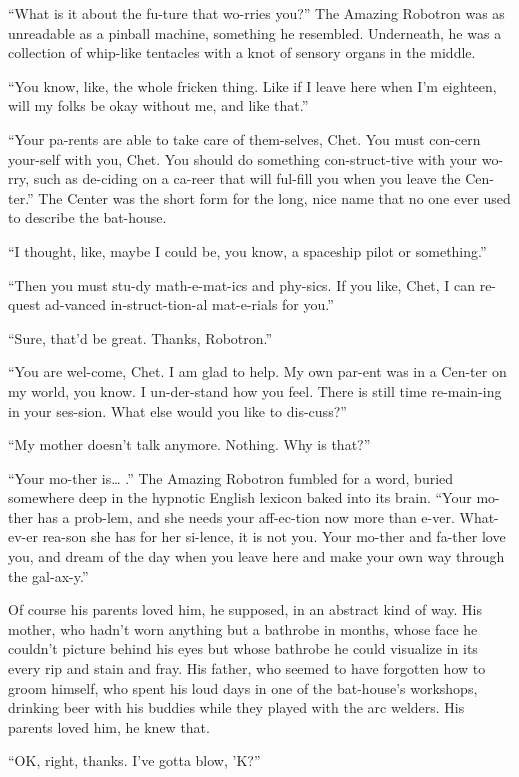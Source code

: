 ``What is it about the fu-ture that wo-rries you?'' The Amazing
Robotron was as unreadable as a pinball machine, something he
resembled. Underneath, he was a collection of whip-like tentacles
with a knot of sensory organs in the middle.

``You know, like, the whole fricken thing. Like if I leave here when I'm 
eighteen, will my folks be okay without me, and like that.''

``Your pa-rents are able to take care of them-selves, Chet. You must con-cern 
your-self with you, Chet. You should do something con-struct-tive with your 
wo-rry, such as de-ciding on a ca-reer that will ful-fill you when you leave 
the Cen-ter.''
The Center was the short form for the long, nice name that no one
ever used to describe the bat-house.

``I thought, like, maybe I could be, you know, a spaceship pilot or something.''

``Then you must stu-dy math-e-mat-ics and phy-sics. If you like, Chet, I can 
re-quest ad-vanced in-struct-tion-al mat-e-rials for you.''

``Sure, that'd be great. Thanks, Robotron.''

``You are wel-come, Chet. I am glad to help. My own par-ent was in a Cen-ter on 
my world, you know. I un-der-stand how you feel. There is still time 
re-main-ing in your ses-sion. What else would you like to dis-cuss?''

``My mother doesn't talk anymore. Nothing. Why is that?''

``Your mo-ther is\ldots{} .'' The Amazing Robotron fumbled for a
word, buried somewhere deep in the hypnotic English lexicon baked
into its brain.
``Your mo-ther has a prob-lem, and she needs your aff-ec-tion now more than 
e-ver. What-ev-er rea-son she has for her si-lence, it is not you. Your mo-ther 
and fa-ther love you, and dream of the day when you leave here and make your 
own way through the gal-ax-y.''

Of course his parents loved him, he supposed, in an abstract kind
of way. His mother, who hadn't worn anything but a bathrobe in
months, whose face he couldn't picture behind his eyes but whose
bathrobe he could visualize in its every rip and stain and fray.
His father, who seemed to have forgotten how to groom himself, who
spent his loud days in one of the bat-house's workshops, drinking
beer with his buddies while they played with the arc welders. His
parents loved him, he knew that.

``OK, right, thanks. I've gotta blow, 'K?''


